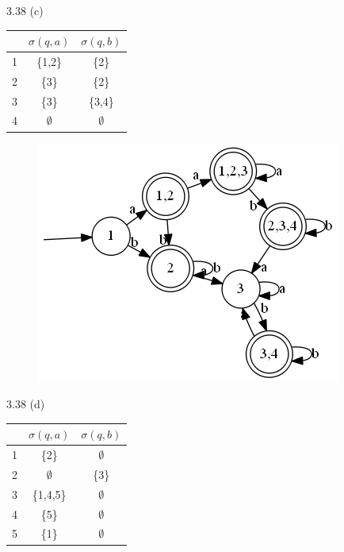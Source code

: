 \documentclass{article}
\begin{document}
\maketitle
\begin{tlist}{10}
	\item[3.38 (c)]\
	\begin{center}
		\begin{tabular}{c|c|c}
			  & $\sigma(q,a)$ & $\sigma(q,b)$ \\\hline
			1 & \{1,2\}       & \{2\}         \\
			2 & \{3\}         & \{2\}         \\
			3 & \{3\}         & \{3,4\}       \\
			4 & $\emptyset$   & $\emptyset$   \\
		\end{tabular}
	\end{center}
	\begin{figure}[H]\centering\includegraphics[scale=.6]{g1.png}\end{figure}
	\item[3.38 (d)]\
	\begin{center}
		\begin{tabular}{c|c|c}
			  & $\sigma(q,a)$ & $\sigma(q,b)$ \\\hline
			1 & \{2\}         & $\emptyset$   \\
			2 & $\emptyset$   & \{3\}         \\
			3 & \{1,4,5\}     & $\emptyset$   \\
			4 & \{5\}         & $\emptyset$   \\
			5 & \{1\}         & $\emptyset$   \\
		\end{tabular}
	\end{center}

\end{tlist}
\end{document}
